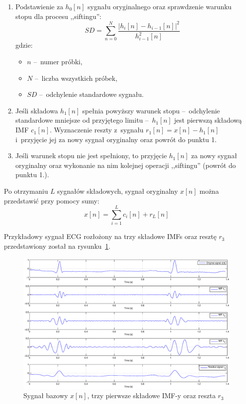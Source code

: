 \begin{enumerate}[1.]
\begin{figure}[!ht]
    \end{figure}
    \item Podstawienie za $h_0[n]$ sygnału oryginalnego oraz sprawdzenie warunku
    stopu dla procesu ,,siftingu'':
    \begin{equation}
        SD = \sum\limits_{n = 0}^{N} \frac{\left| h_i[n] - h_{i - 1}[n]
        \right|^2}{h_{i - 1} ^ 2[n]}
    \end{equation}
    gdzie:
    \begin{itemize}
        \item $n$ --~numer próbki,
        \item $N$ --~liczba wszystkich próbek,
        \item $SD$ --~odchylenie standardowe sygnału.
    \end{itemize}
    \item Jeśli składowa $h_1[n]$ spełnia powyższy warunek stopu --~odchylenie
    standardowe mniejsze od przyjętego limitu --~$h_1[n]$ jest pierwszą składową
    IMF $c_1[n]$. Wyznaczenie reszty z~sygnału $r_1[n] = x[n] - h_1[n]$
    i~przyjęcie jej za nowy sygnał oryginalny oraz powrót do punktu 1.
    \item Jeśli warunek stopu nie jest spełniony, to przyjęcie $h_1[n]$ za nowy
    sygnał oryginalny oraz wykonanie na nim kolejnej operacji ,,siftingu''
    (powrót do punktu 1.).
\end{enumerate}

Po otrzymaniu $L$ sygnałów składowych, sygnał oryginalny $x[n]$ można
przedstawić przy pomocy sumy:
\begin{equation}
    x[n] = \sum\limits_{i = 1}^L c_i[n] + r_L[n]
\end{equation}

\newpage

Przykładowy sygnał ECG rozłożony na trzy składowe IMFs oraz resztę $r_3$
przedstawiony został na rysunku~\ref{fig:sampleimfs}.
\begin{figure}[!ht]
    \centering
    \includegraphics[width=\textwidth]{../img/sampleimfs.eps}
    \caption{Sygnał bazowy $x[n]$, trzy pierwsze składowe IMF-y oraz reszta
    $r_3$}
    \label{fig:sampleimfs}
\end{figure}

